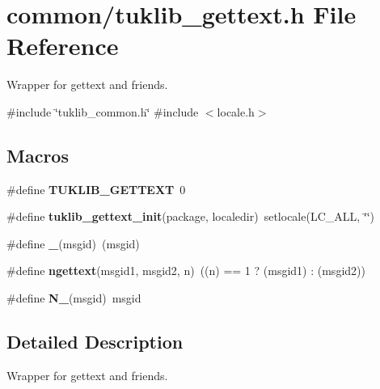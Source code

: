 \section{common/tuklib\+\_\+gettext.h File Reference}
\label{tuklib__gettext_8h}


Wrapper for gettext and friends.  


{\ttfamily \#include \char`\"{}tuklib\+\_\+common.\+h\char`\"{}}\newline
{\ttfamily \#include $<$locale.\+h$>$}\newline
\subsection*{Macros}
\begin{DoxyCompactItemize}
\item 
\mbox{\label{tuklib__gettext_8h_ad23ab054473fd40860e25119a2ea9544}} 
\#define {\bfseries T\+U\+K\+L\+I\+B\+\_\+\+G\+E\+T\+T\+E\+XT}~0
\item 
\mbox{\label{tuklib__gettext_8h_ae51f4118b9bd93c4df9606a63121f4f8}} 
\#define {\bfseries tuklib\+\_\+gettext\+\_\+init}(package,  localedir)~setlocale(L\+C\+\_\+\+A\+LL, \char`\"{}\char`\"{})
\item 
\mbox{\label{tuklib__gettext_8h_a86a239addea586602343007a370bf8ad}} 
\#define {\bfseries \+\_\+}(msgid)~(msgid)
\item 
\mbox{\label{tuklib__gettext_8h_a1db71b632cea57d33a14bafc237c6a70}} 
\#define {\bfseries ngettext}(msgid1,  msgid2,  n)~((n) == 1 ? (msgid1) \+: (msgid2))
\item 
\mbox{\label{tuklib__gettext_8h_abdf0847bd8caa2c2247f5d9bc5e12982}} 
\#define {\bfseries N\+\_\+}(msgid)~msgid
\end{DoxyCompactItemize}


\subsection{Detailed Description}
Wrapper for gettext and friends. 

